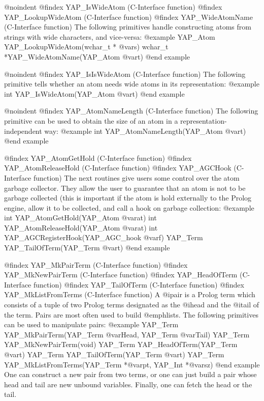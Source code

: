 {{{{{{{{{@noindent
@findex YAP_IsWideAtom (C-Interface function)
@findex YAP_LookupWideAtom (C-Interface function)
@findex YAP_WideAtomName (C-Interface function)
The following primitives handle constructing atoms from strings with
wide characters, and vice-versa:
@example
      YAP_Atom  YAP_LookupWideAtom(wchar_t * @var{s})
      wchar_t  *YAP_WideAtomName(YAP_Atom @var{t})
@end example

@noindent
@findex YAP_IsIsWideAtom (C-Interface function)
The following primitive tells whether an atom needs wide atoms in its
representation:
@example
      int  YAP_IsWideAtom(YAP_Atom @var{t})
@end example

@noindent
@findex YAP_AtomNameLength (C-Interface function)
The following primitive can be used to obtain the size of an atom in a
representation-independent way: 
@example
      int      YAP_AtomNameLength(YAP_Atom @var{t})
@end example

@findex YAP_AtomGetHold  (C-Interface function)
@findex YAP_AtomReleaseHold  (C-Interface function)
@findex YAP_AGCHook  (C-Interface function)
The next routines give users some control over  the atom
garbage collector. They allow the user to guarantee that an atom is not
to be garbage collected (this is important if the atom is hold
externally to the Prolog engine, allow it to be collected, and call a
hook on garbage collection:
@example
      int  YAP_AtomGetHold(YAP_Atom @var{at})
      int  YAP_AtomReleaseHold(YAP_Atom @var{at})
      int  YAP_AGCRegisterHook(YAP_AGC_hook @var{f})
      YAP_Term  YAP_TailOfTerm(YAP_Term @var{t})
@end example

@findex YAP_MkPairTerm (C-Interface function)
@findex YAP_MkNewPairTerm (C-Interface function)
@findex YAP_HeadOfTerm (C-Interface function)
@findex YAP_TailOfTerm (C-Interface function)
@findex YAP_MkListFromTerms (C-Interface function)
A @i{pair} is a Prolog term which consists of a tuple of two Prolog
terms designated as the @i{head} and the @i{tail} of the term. Pairs are
most often used to build @emph{lists}. The following primitives can be
used to manipulate pairs:
@example
      YAP_Term  YAP_MkPairTerm(YAP_Term @var{Head}, YAP_Term @var{Tail})
      YAP_Term  YAP_MkNewPairTerm(void)
      YAP_Term  YAP_HeadOfTerm(YAP_Term @var{t})
      YAP_Term  YAP_TailOfTerm(YAP_Term @var{t})
      YAP_Term  YAP_MkListFromTerms(YAP_Term *@var{pt}, YAP_Int *@var{sz})
@end example
One can construct a new pair from two terms, or one can just build a
pair whose head and tail are new unbound variables. Finally, one can
fetch the head or the tail.

}}}}}}}}}
